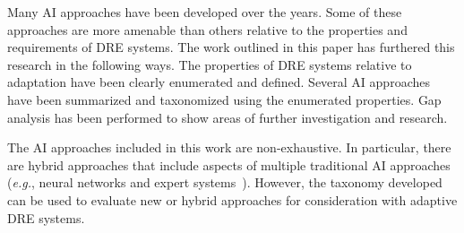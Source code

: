 \documentclass[conference]{IEEEtran}
\begin{document}
Many AI approaches have been developed over the years. Some of these approaches are more amenable than others relative to the properties and requirements of DRE systems. The work outlined in this paper has furthered this research in the following ways. The properties of DRE systems relative to adaptation have been clearly enumerated and defined. Several AI approaches have been summarized and taxonomized using the enumerated properties. Gap analysis has been performed to show areas of further investigation and research.

The AI approaches included in this work are non-exhaustive. In particular, there are hybrid approaches that include aspects of multiple traditional AI approaches (\emph{e.g.}, neural networks and expert systems~\cite{Sahin:2012}). However, the taxonomy developed can be used to evaluate new or hybrid approaches for consideration with adaptive DRE systems.

% 

{

}
\end{document}
